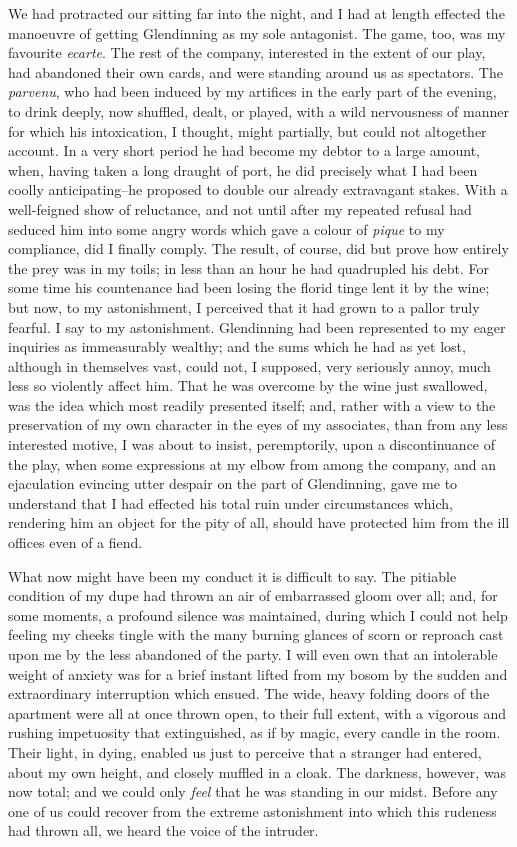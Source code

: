 \documentclass[12pt]{article}
\begin{document}
     We had protracted our sitting far into the night, and I had at
length effected the manoeuvre of getting Glendinning as my sole
antagonist.  The game, too, was my favourite \emph{ecarte}.  The rest
of the company, interested in the extent of our play, had abandoned
their own cards, and were standing around us as spectators.  The 
\emph{parvenu}, who had been induced by my artifices in the early part of
the evening, to drink deeply, now shuffled, dealt, or played, with
a wild nervousness of manner for which his intoxication, I thought,
might partially, but could not altogether account.  In a very short
period he had become my debtor to a large amount, when, having
taken a long draught of port, he did precisely what I had been
coolly anticipating--he proposed to double our already extravagant
stakes.  With a well-feigned show of reluctance, and not until
after my repeated refusal had seduced him into some angry words
which gave a colour of \emph{pique} to my compliance, did I finally
comply.  The result, of course, did but prove how entirely the prey
was in my toils; in less than an hour he had quadrupled his debt. 
For some time his countenance had been losing the florid tinge lent
it by the wine; but now, to my astonishment, I perceived that 
it had grown to a pallor truly fearful.  I say to my
astonishment.  Glendinning had been represented to my eager
inquiries as immeasurably wealthy; and the sums which he had as yet
lost, although in themselves vast, could not, I supposed, very
seriously annoy, much less so violently affect him.  That he was
overcome by the wine just swallowed, was the idea which most
readily presented itself; and, rather with a view to the
preservation of my own character in the eyes of my associates, than
from any less interested motive, I was about to insist,
peremptorily, upon a discontinuance of the play, when some
expressions at my elbow from among the company, and an ejaculation
evincing utter despair on the part of Glendinning, gave me to
understand that I had effected his total ruin under circumstances
which, rendering him an object for the pity of all, should have
protected him from the ill offices even of a fiend.

     What now might have been my conduct it is difficult to say. 
The pitiable condition of my dupe had thrown an air of embarrassed
gloom over all; and, for some moments, a profound silence was
maintained, during which I could not help feeling my cheeks tingle
with the many burning glances of scorn or reproach cast upon me by
the less abandoned of the party.  I will even own that an
intolerable weight of anxiety was for a brief instant lifted from
my bosom by the sudden and extraordinary interruption which ensued. 
The wide, heavy folding doors of the apartment were all at once
thrown open, to their full extent, with a vigorous and rushing
impetuosity that extinguished, as if by magic, every candle in the
room.  Their light, in dying, enabled us just to perceive that a
stranger had entered, about my own height, and closely muffled in
a cloak.  The darkness, however, was now total; and we could only
\emph{feel} that he was standing in our midst.  Before any one of us
could recover from the extreme astonishment into which this
rudeness had thrown all, we heard the voice of the intruder.
\end{document}
